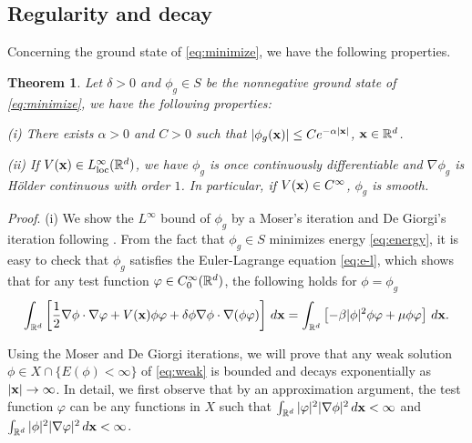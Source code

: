 \documentclass{elsarticle}
\newtheorem{theorem}{Theorem}[section]
\newcommand{\bx}{{\bf x} }
\begin{document}
\subsection{Regularity and decay}
Concerning the ground state of \eqref{eq:minimize}, we have the following properties.
\begin{theorem} \label{thm:gsprop} Let $\delta>0$ and $\phi_g\in S$ be the nonnegative ground state of \eqref{eq:minimize}, we have the following properties:

(i) There exists $\alpha>0$ and $C>0$ such that $|\phi_g(\bx)|\leq C e^{-\alpha |\bx|}$, $\bx\in\Bbb R^d$.

(ii) If $V(\bx)\in L^\infty_{\rm loc}(
\Bbb R^d)$, we have  $\phi_g$ is once continuously differentiable and
 $\nabla \phi_g$ is H\"older continuous with order $1$. In particular, if $V(\bx)\in C^\infty$, $\phi_g$ is smooth.
\end{theorem}
{\noindent\it Proof}. (i) We show the $L^\infty$ bound of $\phi_g$ by a Moser's iteration and De Giorgi's iteration following \cite{Liu2}. From the fact that $\phi_g\in S$
minimizes energy \eqref{eq:energy}, it is easy to check that $\phi_g$ satisfies the Euler-Lagrange equation \eqref{eq:e-l}, which shows that for any test function $\varphi\in C_0^\infty(\Bbb R^d)$, the following holds for $\phi=\phi_g$
\begin{equation}\label{eq:weak}
\int_{\Bbb R^d}\left[\frac{1}{2}\nabla\phi\cdot\nabla\varphi
+V(\bx)\phi\varphi
+\delta\phi\nabla \phi\cdot\nabla (\phi\varphi)\right]\,d\bx=\int_{\Bbb R^d}\left[-\beta|\phi|^2\phi\varphi+\mu\phi\varphi\right]\,d\bx.
\end{equation}

Using the Moser and De Giorgi iterations, we will prove that any
 weak solution $\phi\in X\cap\{E(\phi)<\infty\}$ of \eqref{eq:weak}
is bounded and decays exponentially as $|\bx|\to\infty$.  In detail, we first observe that by an approximation argument,
the test function $\varphi$ can be any functions in $X$ such that
$\int_{\Bbb R^d}|\varphi|^2|\nabla\phi|^2\,d\bx<\infty$ and $\int_{\Bbb R^d}|\phi|^2|\nabla\varphi|^2\,d\bx<\infty$.
\end{document}
